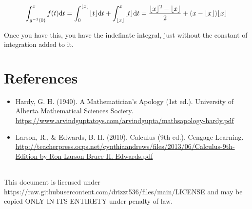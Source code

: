 \documentclass[12pt]{article}
\begin{document}
		\begin{align*}
			\int_{g^{-1}(0)}^xf(t)\text dt
			= \int_{0}^{\lfloor x\rfloor}\lfloor t\rfloor\text dt+\int_{\lfloor x\rfloor}^x\lfloor t\rfloor\text dt
			= \frac{\lfloor x\rfloor^2-\lfloor x\rfloor}2+(x-\lfloor x\rfloor)\lfloor x\rfloor
		\end{align*}

		Once you have this, you have the indefinate integral, just without the constant of
		integration added to it.


\section*{References}
	\begin{itemize}
		\item Hardy, G. H. (1940). A Mathematician’s Apology (1st ed.). University of Alberta Mathematical Sciences Society.\\
			\url{https://www.arvindguptatoys.com/arvindgupta/mathsapology-hardy.pdf}\\

		\item Larson, R., & Edwards, B. H. (2010). Calculus (9th ed.). Cengage Learning.\\
			\url{http://teacherpress.ocps.net/cynthiaandrews/files/2013/06/Calculus-9th-Edition-by-Ron-Larson-Bruce-H.-Edwards.pdf}
	\end{itemize}
	\vspace{12em}\\
	This document is licensed under https://raw.githubusercontent.com/drizzt536/files/main/LICENSE
	and may be copied ONLY IN ITS ENTIRETY under penalty of law.
\end{document}
